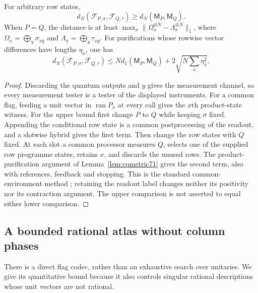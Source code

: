 \begin{lemma}\label{lem:readoutmetric72}
For arbitrary row states,
\[
 d_N(\mathcal F_{P,\sigma},\mathcal F_{Q,\tau})
          \ge d_N(\mathsf M_P,\mathsf M_Q).
\]
When $P=Q$, the distance is at least
$\max_x\|\Omega_x^{\otimes N}-\Lambda_x^{\otimes N}\|_1$,
where $\Omega_x=\bigoplus_y\sigma_{xy}$ and
$\Lambda_x=\bigoplus_y\tau_{xy}$. For purifications whose rowwise
vector differences have lengths $\eta_x$, one has
\begin{equation}\label{eq:readoutupper72}
 d_N(\mathcal F_{P,\sigma},\mathcal F_{Q,\tau})
 \le N d_1(\mathsf M_P,\mathsf M_Q)
                      +2\sqrt{N\sum_x\eta_x^2}.
\end{equation}
\end{lemma}
\begin{proof}
Discarding the quantum outputs and $y$ gives the measurement channel,
so every measurement tester is a tester of the displayed instruments.
For a common flag, feeding a unit vector in $\operatorname{ran}P_x$
at every call gives the $x$th product-state witness. For the upper
bound first change $P$ to $Q$ while keeping $\sigma$ fixed. Appending
the conditional row state is a common postprocessing of the readout,
and a slotwise hybrid gives the first term. Then change the row states
with $Q$ fixed. At each slot a common processor measures $Q$, selects
one of the supplied row programme states, retains $x$, and discards
the unused rows. The product-purification argument of
Lemma~\ref{lem:cqmetric71} gives the second term, also with references,
feedback and stopping. This is the standard common-environment method
\cite[Proposition~2]{DW72}; retaining the readout label changes neither
its positivity nor its contraction argument. The upper comparison is
not asserted to equal either lower comparison.
\end{proof}

\subsection{A bounded rational atlas without column phases}
There is a direct flag codec, rather than an exhaustive search over
unitaries. We give its quantitative bound because it also controls
singular rational descriptions whose unit vectors are not rational.


